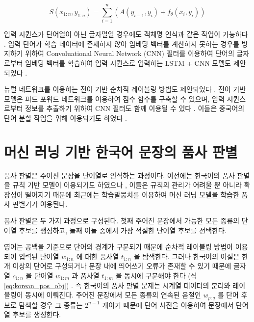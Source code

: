\documentclass[oneside, ko,phd]{snuthesis_utf8_kor}
\begin{document}
\begin{equation}
  \label{eq:rnn_crf_score}
  S(x_{1:n}, y_{1:n}) = \sum_{i=1}^n \left( A(y_{i-1}, y_i) + f_\theta(x_i, y_i) \right)
\end{equation}

입력 시퀀스가 단어열이 아닌 글자열일 경우에도 객체명 인식과 같은 작업이 가능하다 \cite{gridach2017character}.
입력 단어가 학습 데이터에 존재하지 않아 임베딩 벡터를 계산하지 못하는 경우를 방지하기 위하여 Convoluational Neural Network (CNN) 필터를 이용하여 단어의 글자로부터 임베딩 벡터를 학습하여 입력 시퀀스로 입력하는 LSTM + CNN 모델도 제안되었다 \cite{chiu2016named}.

뉴럴 네트워크를 이용하는 전이 기반 순차적 레이블링 방법도 제안되었다 \cite{zheng2013deep, collobert2011natural, alberti2015improved}.
전이 기반 모델은 피드 포워드 네트워크를 이용하여 점수 함수를 구축할 수 있으며, 입력 시퀀스로부터 정보를 추출하기 위하여 CNN 필터도 함께 이용될 수 있다 \cite{collobert2011natural}.
이들은 중국어의 단어 분할 작업을 위해 이용되기도 하였다 \cite{zhang2016transition, cai2017fast, ballesteros2015improved}.

\section{머신 러닝 기반 한국어 문장의 품사 판별}

품사 판별은 주어진 문장을 단어열로 인식하는 과정이다.
이전에는 한국어의 품사 판별을 규칙 기반 모델이 이용되기도 하였으나 \cite{yang2000part, choi1993bidirectional}, 이들은 규칙의 관리가 어려울 뿐 아니라 확장성이 떨어지기 때문에 최근에는 학습말뭉치를 이용하여 머신 러닝 모델을 학습한 품사 판별기가 이용된다.

품사 판별은 두 가지 과정으로 구성된다.
첫째 주어진 문장에서 가능한 모든 종류의 단어열 후보를 생성하고, 둘째 이들 중에서 가장 적절한 단어열 후보를 선택한다.

영어는 공백을 기준으로 단어의 경계가 구분되기 때문에 순차적 레이블링 방법이 이용되어 입력된 단어열 $w_{1:n}$ 에 대한 품사열 $t_{1:n}$ 을 탐색한다.
그러나 한국어의 어절은 한 개 이상의 단어로 구성되거나 문장 내에 띄어쓰기 오류가 존재할 수 있기 때문에 글자열 $c_{1:n}$ 을 단어열 $w_{1:m}$ 과 품사열 $t_{1:m}$ 을 동시에 구분해야 한다 (식 \ref{eq:korean_pos_obj}) \cite{lee2011koreanpos}.
즉 한국어의 품사 판별 문제는 시계열 데이터의 분리와 레이블링이 동시에 이뤄진다.
주어진 문장에서 모든 종류의 연속된 음절인 $w_{p:q}$ 를 단어 후보로 탐색할 경우 그 종류는 $2^{n-1}$ 개이기 때문에 단어 사전을 이용하여 문장에서 단어열 후보를 생성한다.
\end{document}
